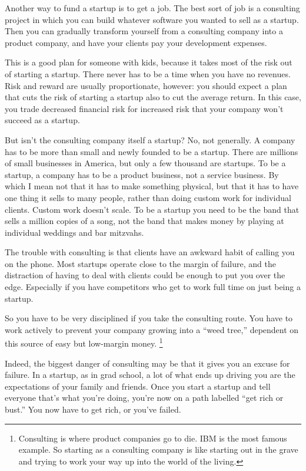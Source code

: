 Another way to fund a startup is to get a job. The best sort of job is a
consulting project in which you can build whatever software you wanted
to sell as a startup. Then you can gradually transform yourself from a
consulting company into a product company, and have your clients pay
your development expenses.

This is a good plan for someone with kids, because it takes most of the
risk out of starting a startup. There never has to be a time when you
have no revenues. Risk and reward are usually proportionate, however:
you should expect a plan that cuts the risk of starting a startup also
to cut the average return. In this case, you trade decreased financial
risk for increased risk that your company won't succeed as a startup.

But isn't the consulting company itself a startup? No, not generally. A
company has to be more than small and newly founded to be a startup.
There are millions of small businesses in America, but only a few
thousand are startups. To be a startup, a company has to be a product
business, not a service business. By which I mean not that it has to
make something physical, but that it has to have one thing it sells to
many people, rather than doing custom work for individual clients.
Custom work doesn't scale. To be a startup you need to be the band that
sells a million copies of a song, not the band that makes money by
playing at individual weddings and bar mitzvahs.

The trouble with consulting is that clients have an awkward habit of
calling you on the phone. Most startups operate close to the margin of
failure, and the distraction of having to deal with clients could be
enough to put you over the edge. Especially if you have competitors who
get to work full time on just being a startup.

So you have to be very disciplined if you take the consulting route. You
have to work actively to prevent your company growing into a ``weed
tree,'' dependent on this source of easy but low-margin money.
\footnote{Consulting is where product companies go to die. IBM is the most
famous example. So starting as a consulting company is like starting out
in the grave and trying to work your way up into the world of the
living.}

Indeed, the biggest danger of consulting may be that it gives you an
excuse for failure. In a startup, as in grad school, a lot of what ends
up driving you are the expectations of your family and friends. Once you
start a startup and tell everyone that's what you're doing, you're now
on a path labelled ``get rich or bust.'' You now have to get rich, or
you've failed.

